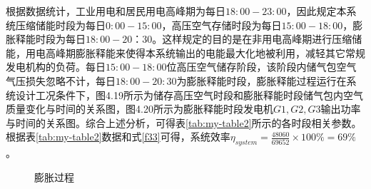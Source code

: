\documentclass[journal,onecolumn]{IEEEtran}
\begin{document}
根据数据统计，工业用电和居民用电高峰期为每日$ 18:00-23:00 $，因此规定本系统压缩储能时段为每日$ 0:00-15:00 $，高压空气存储时段为每日$ 15:00-18:00 $，膨胀释能时段为每日$ 18:00-20：30 $。这样规定的目的是在非用电高峰期进行压缩储能，用电高峰期膨胀释能来使得本系统输出的电能最大化地被利用，减轻其它常规发电机构的负荷。每日$ 15:00-18:00 $位高压空气储存阶段，该阶段内储气包空气气压损失忽略不计，每日$ 18:00-20:30 $为膨胀释能时段，膨胀释能过程运行在系统设计工况条件下，图4.19所示为储存高压空气时段和膨胀释能时段储气包内空气质量变化与时间的关系图，图4.20所示为膨胀释能时段发电机$ G1,G2,G3 $输出功率与时间的关系图。综合上述分析，可得表\ref{tab:my-table2}所示的各时段相关参数。根据表\ref{tab:my-table2}数据和式\ref{f33}可得，系统效率$ \eta_{system}=\frac{48060}{69652} \times 100\%=69\% $。

\begin{figure}[ht]
	\caption{膨胀过程} %
	\label{fig:14}  %
\end{figure}
\end{document}

